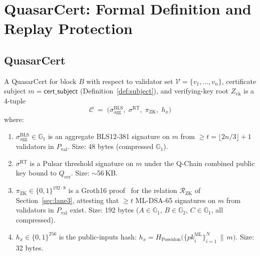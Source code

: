 \section{QuasarCert: Formal Definition and Replay Protection}

\label{sec:quasarcert}

\subsection{QuasarCert}

\begin{definition}[QuasarCert]
\label{def:quasarcert}
A QuasarCert for block $B$ with respect to validator set
$\mathcal{V} = \{v_1, \ldots, v_n\}$, certificate subject
$m = \mathsf{cert\_subject}$ (Definition~\ref{def:subject}), and
verifying-key root $Z_\text{vk}$ is a 4-tuple
\[
\mathcal{C} \;=\; \bigl(\sigma^{\mathrm{BLS}}_{\mathrm{agg}},\;
\sigma^{\mathrm{RT}},\;
\pi_{\mathrm{ZK}},\;
h_x\bigr)
\]
where:
\begin{enumerate}[leftmargin=2em,nosep]
  \item $\sigma^{\mathrm{BLS}}_{\mathrm{agg}} \in \mathbb{G}_1$ is an
    aggregate BLS12-381 signature on $m$ from $\geq t = \lfloor 2n/3
    \rfloor + 1$ validators in $P_\text{val}$. Size: 48 bytes
    (compressed $\mathbb{G}_1$).
  \item $\sigma^{\mathrm{RT}}$ is a Pulsar threshold signature on $m$
    under the Q-Chain combined public key bound to $Q_\text{cer}$.
    Size: ${\sim}56$\,KB.
  \item $\pi_{\mathrm{ZK}} \in \{0,1\}^{192 \cdot 8}$ is a Groth16
    proof~\cite{groth2016} for the relation $\mathcal{R}_{\mathrm{ZK}}$
    of Section~\ref{sec:lane3}, attesting that $\geq t$ ML-DSA-65
    signatures on $m$ from validators in $P_\text{val}$ exist.
    Size: 192 bytes ($A \in \mathbb{G}_1$, $B \in \mathbb{G}_2$,
    $C \in \mathbb{G}_1$, all compressed).
  \item $h_x \in \{0,1\}^{256}$ is the public-inputs hash:
    $h_x = H_{\text{Poseidon}}\bigl(\{\mathit{pk}_i^{\mathrm{ML}}\}_{i=1}^N
    \,\|\, m\bigr)$. Size: 32 bytes.
\end{enumerate}
\end{definition}


